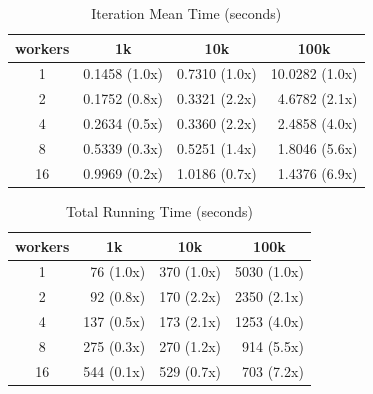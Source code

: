 \documentclass[%
  final,
  notitlepage,
  narroweqnarray,
  inline,
]{ieee}
\begin{document}
\begin{table}[htbp]
  \label{table_iteration_mean_time}
  \caption{Iteration Mean Time (seconds)}
  \small
  \begin{center}
    \begin{tabular}{crrr}
    workers  & \multicolumn{1}{c}{1k} & \multicolumn{1}{c}{10k}
             & \multicolumn{1}{c}{100k} \\
      \hline
    1  & 0.1458 (1.0x) & 0.7310 (1.0x) & 10.0282 (1.0x) \\
    2  & 0.1752 (0.8x) & 0.3321 (2.2x) & 4.6782  (2.1x) \\
    4  & 0.2634 (0.5x) & 0.3360 (2.2x) & 2.4858  (4.0x) \\
    8  & 0.5339 (0.3x) & 0.5251 (1.4x) & 1.8046  (5.6x) \\
    16 & 0.9969 (0.2x) & 1.0186 (0.7x) & 1.4376  (6.9x) \\
    \end{tabular}
  \end{center}
\end{table}


\begin{table}[htbp]
  \label{table_total_running_time}
  \caption{Total Running Time (seconds)}
  \small
  \begin{center}
    \begin{tabular}{crrr}
    workers  & \multicolumn{1}{c}{1k} & \multicolumn{1}{c}{10k}
             & \multicolumn{1}{c}{100k} \\
      \hline
    1  &  76  (1.0x) & 370 (1.0x) & 5030 (1.0x) \\
    2  &  92  (0.8x) & 170 (2.2x) & 2350 (2.1x) \\
    4  & 137  (0.5x) & 173 (2.1x) & 1253 (4.0x) \\
    8  & 275  (0.3x) & 270 (1.2x) & 914  (5.5x) \\
    16 & 544  (0.1x) & 529 (0.7x) & 703  (7.2x) \\
    \end{tabular}
  \end{center}
\end{table}
\end{document}

